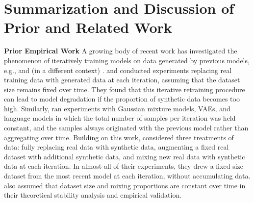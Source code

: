 \section{Summarization and Discussion of Prior and Related Work}
\label{app:sec:prior_work}

\textbf{Prior Empirical Work} A growing body of recent work has investigated the phenomenon of iteratively training models on data generated by previous models, e.g., \citet{hataya2023will,martinez2023combining,shumailov2023curse, alemohammad2023self,martinez2023towards,bertrand2023stability,briesch2023large, dohmatob2024model, dohmatob2024tale} and (in a different context) \citet{taori2023data}.
\citet{hataya2023will} and \citet{martinez2023towards} conducted experiments replacing real training data with generated data at each iteration, assuming that the dataset size remains fixed over time. They found that this iterative retraining procedure can lead to model degradation if the proportion of synthetic data becomes too high. Similarly, \citet{shumailov2023curse} ran experiments with Gaussian mixture models, VAEs, and language models in which the total number of samples per iteration was held constant, and the samples always originated with the previous model rather than aggregating over time. Building on this work, \citet{alemohammad2023self} considered three treatments of data: fully replacing real data with synthetic data, augmenting a fixed real dataset with additional synthetic data, and mixing new real data with synthetic data at each iteration. In almost all of their experiments, they drew a fixed size dataset from the most recent model at each iteration, without accumulating data. \citet{bertrand2023stability} also assumed that dataset size and mixing proportions are constant over time in their theoretical stability analysis and empirical validation. %

